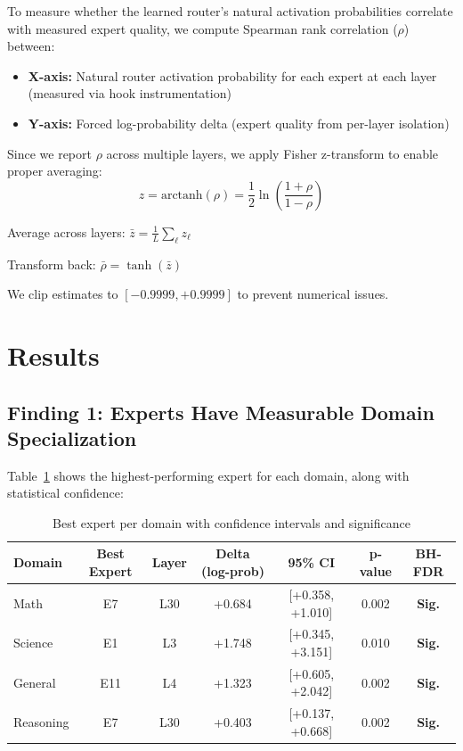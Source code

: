 \documentclass[11pt,a4paper]{article}
\begin{document}
To measure whether the learned router's natural activation probabilities correlate with measured expert quality, we compute Spearman rank correlation ($\rho$) between:
\begin{itemize}
\item \textbf{X-axis:} Natural router activation probability for each expert at each layer (measured via hook instrumentation)
\item \textbf{Y-axis:} Forced log-probability delta (expert quality from per-layer isolation)
\end{itemize}

Since we report $\rho$ across multiple layers, we apply Fisher z-transform to enable proper averaging:
\begin{equation}
z = \text{arctanh}(\rho) = \frac{1}{2} \ln\left(\frac{1+\rho}{1-\rho}\right)
\end{equation}

Average across layers: $\bar{z} = \frac{1}{L} \sum_{\ell} z_{\ell}$

Transform back: $\bar{\rho} = \tanh(\bar{z})$

We clip estimates to $[-0.9999, +0.9999]$ to prevent numerical issues.

\section{Results}

\subsection{Finding 1: Experts Have Measurable Domain Specialization}

Table~\ref{tab:best_experts} shows the highest-performing expert for each domain, along with statistical confidence:

\begin{table}[h]
\centering
\caption{Best expert per domain with confidence intervals and significance}
\label{tab:best_experts}
\begin{tabular}{lcccccc}
\toprule
\textbf{Domain} & \textbf{Best Expert} & \textbf{Layer} & \textbf{Delta (log-prob)} & \textbf{95\% CI} & \textbf{p-value} & \textbf{BH-FDR} \\
\midrule
Math & E7 & L30 & +0.684 & {[+0.358, +1.010]} & 0.002 & \textbf{Sig.} \\
Science & E1 & L3 & +1.748 & {[+0.345, +3.151]} & 0.010 & \textbf{Sig.} \\
General & E11 & L4 & +1.323 & {[+0.605, +2.042]} & 0.002 & \textbf{Sig.} \\
Reasoning & E7 & L30 & +0.403 & {[+0.137, +0.668]} & 0.002 & \textbf{Sig.} \\
\bottomrule
\end{tabular}
\end{table}
\end{document}
